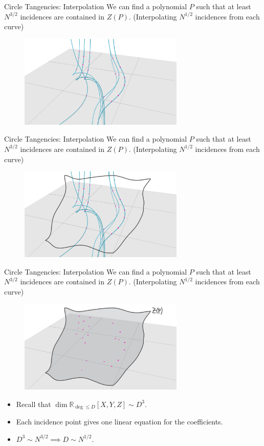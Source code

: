 \documentclass{beamer}
\newcommand{\RR}{\mathbb R}
\newcommand{\nfr}[1]{\begin{frame} #1
\end{frame}}
\begin{document}
\nfr{{Circle Tangencies: Interpolation}
We can find a polynomial $P$ such that at least $N^{3/2}$  incidences are contained in $Z(P)$. (Interpolating $N^{1/2}$ incidences from each curve)
\begin{figure}[h]
    \centering
    \includegraphics[width=0.7\textwidth]{images/lots_of_dots_a.png}
\end{figure}
}
\nfr{{Circle Tangencies: Interpolation}
We can find a polynomial $P$ such that at least $N^{3/2}$  incidences are contained in $Z(P)$. (Interpolating $N^{1/2}$ incidences from each curve)

\begin{figure}[h]
    \centering
    \includegraphics[width=0.7\textwidth]{images/lots_of_dots_b.png}
\end{figure}
}



\nfr{{Circle Tangencies: Interpolation}
We can find a polynomial $P$ such that at least $N^{3/2}$  incidences are contained in $Z(P)$. (Interpolating $N^{1/2}$ incidences from each curve)
\begin{figure}[h]
    \centering
    \includegraphics[width=0.7\textwidth]{images/lots_of_dots_c.png}
\end{figure} \pause
\begin{itemize}
    \item Recall that $\dim \RR_{\deg \leq D} [X,Y,Z] \sim D^3$. \pause
    \item Each incidence point gives one linear equation for the coefficients. \pause
    \item $D^3 \sim N^{3/2} \implies D \sim N^{1/2}$.
\end{itemize}

}
\end{document}
